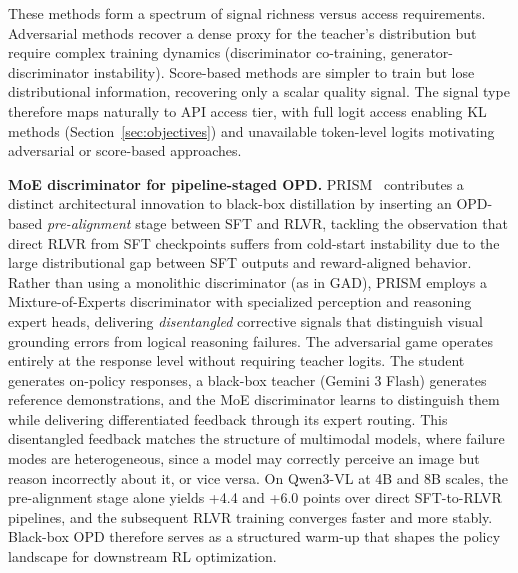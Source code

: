 \documentclass{article} %
\begin{document}
These methods form a spectrum of signal richness versus access requirements. Adversarial methods recover a dense proxy for the teacher's distribution but require complex training dynamics (discriminator co-training, generator-discriminator instability). Score-based methods are simpler to train but lose distributional information, recovering only a scalar quality signal. The signal type therefore maps naturally to API access tier, with full logit access enabling KL methods (Section~\ref{sec:objectives}) and unavailable token-level logits motivating adversarial or score-based approaches.

\textbf{MoE discriminator for pipeline-staged OPD.} PRISM~\citep{2604.28123} contributes a distinct architectural innovation to black-box distillation by inserting an OPD-based \emph{pre-alignment} stage between SFT and RLVR, tackling the observation that direct RLVR from SFT checkpoints suffers from cold-start instability due to the large distributional gap between SFT outputs and reward-aligned behavior. Rather than using a monolithic discriminator (as in GAD), PRISM employs a Mixture-of-Experts discriminator with specialized perception and reasoning expert heads, delivering \emph{disentangled} corrective signals that distinguish visual grounding errors from logical reasoning failures. The adversarial game operates entirely at the response level without requiring teacher logits. The student generates on-policy responses, a black-box teacher (Gemini 3 Flash) generates reference demonstrations, and the MoE discriminator learns to distinguish them while delivering differentiated feedback through its expert routing. This disentangled feedback matches the structure of multimodal models, where failure modes are heterogeneous, since a model may correctly perceive an image but reason incorrectly about it, or vice versa. On Qwen3-VL at 4B and 8B scales, the pre-alignment stage alone yields +4.4 and +6.0 points over direct SFT-to-RLVR pipelines, and the subsequent RLVR training converges faster and more stably. Black-box OPD therefore serves as a structured warm-up that shapes the policy landscape for downstream RL optimization.
\end{document}
